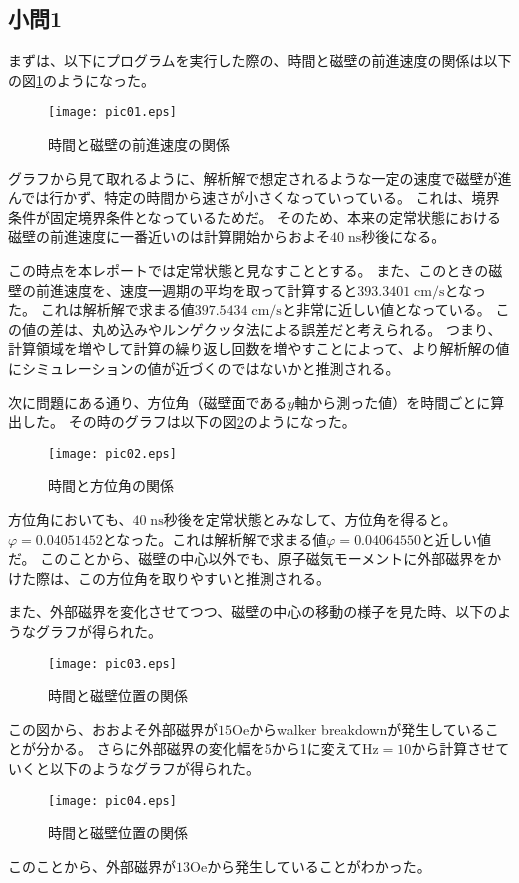 \documentclass{jsarticle}
\begin{document}
\subsection{小問1}
まずは、以下にプログラムを実行した際の、時間と磁壁の前進速度の関係は以下の図\ref{fig01}のようになった。
\begin{figure}[H]
	\centering
	\texttt{[image: pic01.eps]}
	\caption{時間と磁壁の前進速度の関係}
	\label{fig01}
\end{figure}

グラフから見て取れるように、解析解で想定されるような一定の速度で磁壁が進んでは行かず、特定の時間から速さが小さくなっていっている。
これは、境界条件が固定境界条件となっているためだ。
そのため、本来の定常状態における磁壁の前進速度に一番近いのは計算開始からおよそ$40\;\mathrm{ns}$秒後になる。

この時点を本レポートでは定常状態と見なすこととする。
また、このときの磁壁の前進速度を、速度一週期の平均を取って計算すると$393.3401\;\mathrm{cm/s}$となった。
これは解析解で求まる値$397.5434\;\mathrm{cm/s}$と非常に近しい値となっている。
この値の差は、丸め込みやルンゲクッタ法による誤差だと考えられる。
つまり、計算領域を増やして計算の繰り返し回数を増やすことによって、より解析解の値にシミュレーションの値が近づくのではないかと推測される。

次に問題にある通り、方位角（磁壁面である$y$軸から測った値）を時間ごとに算出した。
その時のグラフは以下の図\ref{fig02}のようになった。
\begin{figure}[H]
	\centering
	\texttt{[image: pic02.eps]}
	\caption{時間と方位角の関係}
	\label{fig02}
\end{figure}
方位角においても、$40\;\mathrm{ns}$秒後を定常状態とみなして、方位角を得ると。
$\varphi = 0.04051452$となった。これは解析解で求まる値$\varphi = 0.04064550$と近しい値だ。
このことから、磁壁の中心以外でも、原子磁気モーメントに外部磁界をかけた際は、この方位角を取りやすいと推測される。

また、外部磁界を変化させてつつ、磁壁の中心の移動の様子を見た時、以下のようなグラフが得られた。
\begin{figure}[H]
	\centering
	\texttt{[image: pic03.eps]}
	\caption{時間と磁壁位置の関係}
	\label{fig03}
\end{figure}
この図から、おおよそ外部磁界が$15\mathrm{Oe}$からwalker breakdownが発生していることが分かる。
さらに外部磁界の変化幅を5から1に変えて$\mathrm{Hz} = 10$から計算させていくと以下のようなグラフが得られた。
\begin{figure}[H]
	\centering
	\texttt{[image: pic04.eps]}
	\caption{時間と磁壁位置の関係}
	\label{fig04}
\end{figure}
このことから、外部磁界が$13\mathrm{Oe}$から発生していることがわかった。
\end{document}

